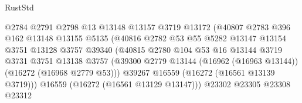 \begin{lexlean}{RustStd}
\begin{coremodule}
                                        @2784
                                        @2791
                                        @2798
                                        @13
                                        @13148
                                        @13157
                                        @3719
                                        @13172
                                        (@40807
                                          @2783
                                          @396
                                          @162
                                          @13148
                                          @13155
                                          @5135
                                          (@40816
                                            @2782
                                            @53
                                            @55
                                            @5282
                                            @13147
                                            @13154
                                            @3751
                                            @13128
                                            @3757
                                            @39340
                                            (@40815
                                              @2780
                                              @104
                                              @53
                                              @16
                                              @13144
                                              @3719
                                              @3731
                                              @3751
                                              @13138
                                              @3757
                                              (@39300
                                                @2779
                                                @13144
                                                (@16962 (@16963 @13144))
                                                (@16272 (@16968 @2779 @53)))
                                              @39267
                                              @16559
                                              (@16272 (@16561 @13139 @3719)))
                                            @16559
                                            (@16272 (@16561 @13129 @13147)))
                                          @23302
                                          @23305
                                          @23308
                                          @23312

\end{coremodule}
\end{lexlean}
